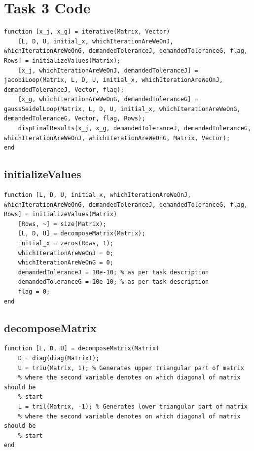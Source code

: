 \section{Task 3 Code}
\begin{simplechar}
\begin{lstlisting}
function [x_j, x_g] = iterative(Matrix, Vector)
    [L, D, U, initial_x, whichIterationAreWeOnJ, whichIterationAreWeOnG, demandedToleranceJ, demandedToleranceG, flag, Rows] = initializeValues(Matrix);
    [x_j, whichIterationAreWeOnJ, demandedToleranceJ] = jacobiLoop(Matrix, L, D, U, initial_x, whichIterationAreWeOnJ, demandedToleranceJ, Vector, flag);
    [x_g, whichIterationAreWeOnG, demandedToleranceG] = gaussSeidelLoop(Matrix, L, D, U, initial_x, whichIterationAreWeOnG, demandedToleranceG, Vector, flag, Rows);
    dispFinalResults(x_j, x_g, demandedToleranceJ, demandedToleranceG, whichIterationAreWeOnJ, whichIterationAreWeOnG, Matrix, Vector);
end

\end{lstlisting}
\end{simplechar}

\newpage
\subsection{initializeValues}
\begin{simplechar}
\begin{lstlisting}
function [L, D, U, initial_x, whichIterationAreWeOnJ, whichIterationAreWeOnG, demandedToleranceJ, demandedToleranceG, flag, Rows] = initializeValues(Matrix)
    [Rows, ~] = size(Matrix);
    [L, D, U] = decomposeMatrix(Matrix);
    initial_x = zeros(Rows, 1);
    whichIterationAreWeOnJ = 0;
    whichIterationAreWeOnG = 0;
    demandedToleranceJ = 10e-10; % as per task description
    demandedToleranceG = 10e-10; % as per task description
    flag = 0;
end
\end{lstlisting}
\end{simplechar}

\subsection{decomposeMatrix}
\begin{simplechar}
\begin{lstlisting}
function [L, D, U] = decomposeMatrix(Matrix)
    D = diag(diag(Matrix));
    U = triu(Matrix, 1); % Generates upper triangular part of matrix
    % where the second variable denotes on which diagonal of matrix should be
    % start
    L = tril(Matrix, -1); % Generates lower triangular part of matrix
    % where the second variable denotes on which diagonal of matrix should be
    % start
end
\end{lstlisting}
\end{simplechar}

